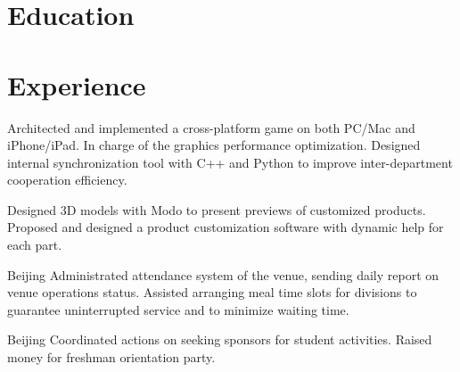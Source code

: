 \documentclass[11pt,a4paper]{moderncv/moderncv}
\begin{document}
\maketitle

\section{Education}


\section{Experience}

{
Architected and implemented a cross-platform game on both PC/Mac and iPhone/iPad. In charge of the graphics performance optimization.
Designed internal synchronization tool with C++ and Python to improve inter-department cooperation efficiency.
}

{
Designed 3D models with Modo to present previews of customized products.
Proposed and designed a product customization software with dynamic help for each part.
}

{Beijing}{}
{
Administrated attendance system of the venue, sending daily report on venue operations status.
Assisted arranging meal time slots for divisions to guarantee uninterrupted service and to minimize waiting time.
}

{Beijing}{}
{
Coordinated actions on seeking sponsors for student activities.
Raised money for freshman orientation party.
}
\end{document}
